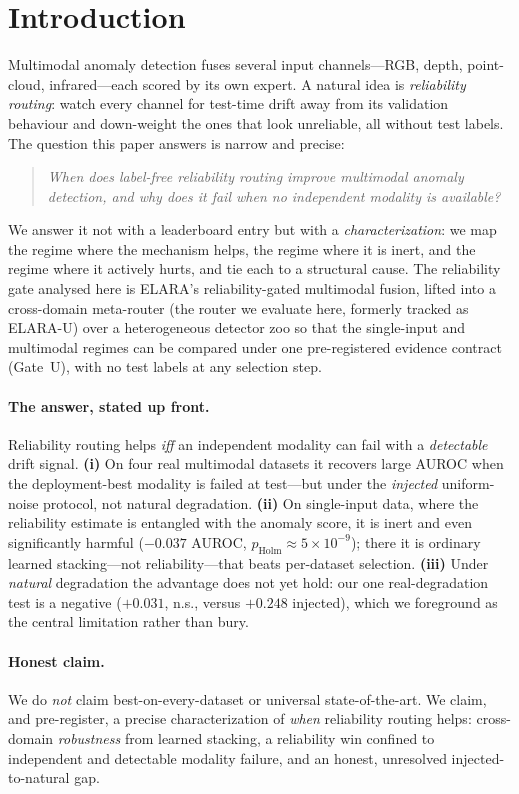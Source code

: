 \documentclass[10pt,conference]{IEEEtran}
\begin{document}
\section{Introduction}
Multimodal anomaly detection fuses several input channels---RGB, depth,
point-cloud, infrared---each scored by its own expert. A natural idea is
\emph{reliability routing}: watch every channel for test-time drift away from its
validation behaviour and down-weight the ones that look unreliable, all without test
labels. The question this paper answers is narrow and precise:
\begin{quote}\emph{When does label-free reliability routing improve multimodal
anomaly detection, and why does it fail when no independent modality is
available?}\end{quote}
We answer it not with a leaderboard entry but with a \emph{characterization}: we map
the regime where the mechanism helps, the regime where it is inert, and the regime
where it actively hurts, and tie each to a structural cause. The reliability gate
analysed here is ELARA's reliability-gated multimodal fusion, lifted into a
cross-domain meta-router (the router we evaluate here, formerly tracked as ELARA-U)
over a heterogeneous detector zoo so that the single-input and multimodal regimes can
be compared under one pre-registered evidence contract (Gate~U), with no test labels
at any selection step.

\paragraph{The answer, stated up front.} Reliability routing helps \emph{iff} an
independent modality can fail with a \emph{detectable} drift signal.
\textbf{(i)} On four real multimodal datasets it recovers large AUROC when the
deployment-best modality is failed at test---but under the \emph{injected}
uniform-noise protocol, not natural degradation.
\textbf{(ii)} On single-input data, where the reliability estimate is entangled with
the anomaly score, it is inert and even significantly harmful ($-0.037$ AUROC,
$p_{\mathrm{Holm}}\!\approx\!5\!\times\!10^{-9}$); there it is ordinary learned
stacking---not reliability---that beats per-dataset selection.
\textbf{(iii)} Under \emph{natural} degradation the advantage does not yet hold: our
one real-degradation test is a negative ($+0.031$, n.s., versus $+0.248$ injected),
which we foreground as the central limitation rather than bury.

\paragraph{Honest claim.} We do \emph{not} claim best-on-every-dataset or universal
state-of-the-art. We claim, and pre-register, a precise characterization of
\emph{when} reliability routing helps: cross-domain \emph{robustness} from learned
stacking, a reliability win confined to independent and detectable modality failure,
and an honest, unresolved injected-to-natural gap.
\end{document}
